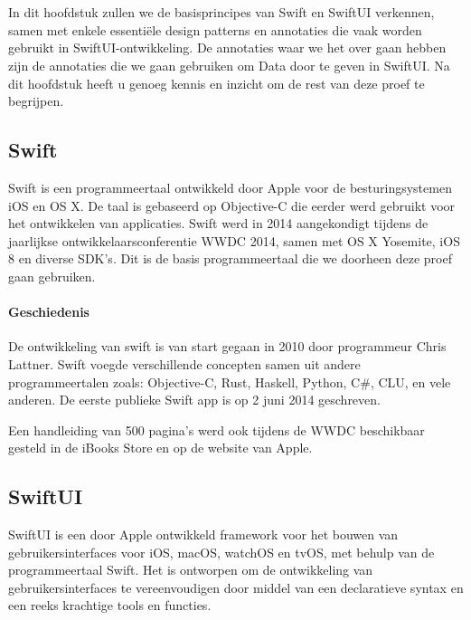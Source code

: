 \chapter{}%
\label{ch:stand-van-zaken}


In dit hoofdstuk zullen we de basisprincipes van Swift en SwiftUI verkennen, samen met enkele essentiële design patterns en annotaties die vaak worden gebruikt in SwiftUI-ontwikkeling. De annotaties waar we het over gaan hebben zijn de annotaties die we gaan gebruiken om Data door te geven in SwiftUI. Na dit hoofdstuk heeft u genoeg kennis en inzicht om de rest van deze proef te begrijpen.

\section{Swift}
\autocite{WikiSwift} Swift is een programmeertaal ontwikkeld door Apple voor de besturingsystemen iOS en OS X. De taal is gebaseerd op Objective-C die eerder werd gebruikt voor het ontwikkelen van applicaties. Swift werd in 2014 aangekondigt tijdens de jaarlijkse ontwikkelaarsconferentie WWDC 2014, samen met OS X Yosemite, iOS 8 en diverse SDK's. Dit is de basis programmeertaal die we doorheen deze proef gaan gebruiken.
\subsubsection{Geschiedenis}
De ontwikkeling van swift is van start gegaan in 2010 door programmeur Chris Lattner. Swift voegde verschillende concepten samen uit andere programmeertalen zoals: Objective-C, Rust, Haskell, Python, C\#, CLU, en vele anderen. De eerste publieke Swift app is op 2 juni 2014 geschreven.

Een handleiding van 500 pagina's werd ook tijdens de WWDC beschikbaar gesteld in de iBooks Store en op de website van Apple.
\section{SwiftUI}
\autocite{AppleSwiftUI} SwiftUI is een door Apple ontwikkeld framework voor het bouwen van gebruikersinterfaces voor iOS, macOS, watchOS en tvOS, met behulp van de programmeertaal Swift. Het is ontworpen om de ontwikkeling van gebruikersinterfaces te vereenvoudigen door middel van een declaratieve syntax en een reeks krachtige tools en functies.

